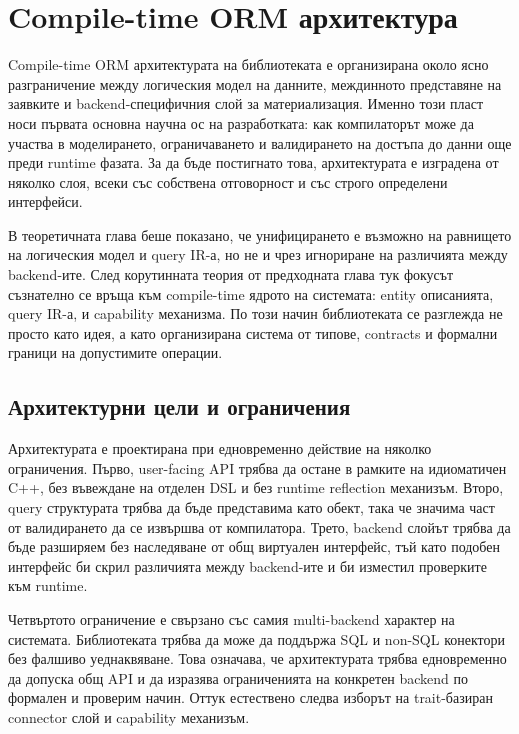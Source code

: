 \section{Compile-time ORM архитектура}
\label{sec:architecture}

Compile-time ORM архитектурата на библиотеката е организирана около ясно разграничение между логическия модел на данните, междинното представяне на заявките и backend-специфичния слой за материализация. Именно този пласт носи първата основна научна ос на разработката: как компилаторът може да участва в моделирането, ограничаването и валидирането на достъпа до данни още преди runtime фазата. За да бъде постигнато това, архитектурата е изградена от няколко слоя, всеки със собствена отговорност и със строго определени интерфейси.

В теоретичната глава беше показано, че унифицирането е възможно на равнището на логическия модел и query IR-а, но не и чрез игнориране на различията между backend-ите. След корутинната теория от предходната глава тук фокусът съзнателно се връща към compile-time ядрото на системата: entity описанията, query IR-а,  и capability механизма. По този начин библиотеката се разглежда не просто като идея, а като организирана система от типове, contracts и формални граници на допустимите операции.

\subsection{Архитектурни цели и ограничения}

Архитектурата е проектирана при едновременно действие на няколко ограничения. Първо, user-facing API трябва да остане в рамките на идиоматичен C++, без въвеждане на отделен DSL и без runtime reflection механизъм. Второ, query структурата трябва да бъде представима като  обект, така че значима част от валидирането да се извършва от компилатора. Трето, backend слойът трябва да бъде разширяем без наследяване от общ виртуален интерфейс, тъй като подобен интерфейс би скрил различията между backend-ите и би изместил проверките към runtime.

Четвъртото ограничение е свързано със самия multi-backend характер на системата. Библиотеката трябва да може да поддържа SQL и non-SQL конектори без фалшиво уеднаквяване. Това означава, че архитектурата трябва едновременно да допуска общ API и да изразява ограниченията на конкретен backend по формален и проверим начин. Оттук естествено следва изборът на trait-базиран connector слой и capability механизъм.


